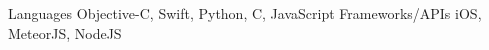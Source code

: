 \begin{cvskills}
  \cvskill
    {Languages}
    {Objective-C, Swift, Python, C, JavaScript}
  \cvskill
    {Frameworks/APIs}
    {iOS, MeteorJS, NodeJS}  
\end{cvskills}


